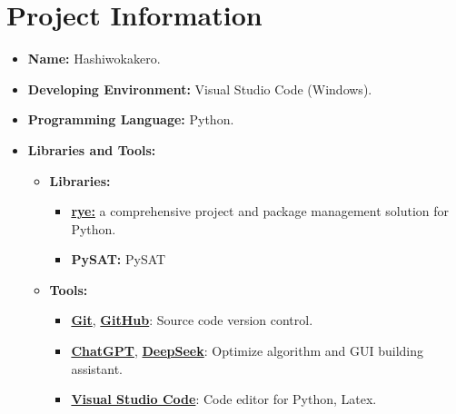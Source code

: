 \section{Project Information}
\begin{itemize}
  \item \textbf{Name:} Hashiwokakero.
  \item \textbf{Developing Environment:} Visual Studio Code (Windows).
  \item \textbf{Programming Language:} Python.
  \item \textbf{Libraries and Tools:}
        \begin{itemize}
          \item \textbf{Libraries:}
                \begin{itemize}
                  \item \href{https://rye.astral.sh/}{\textbf{rye:}} a comprehensive project and package management solution for Python.
                  \item \textbf{PySAT:} PySAT
                \end{itemize}
          \item \textbf{Tools:}
                \begin{itemize}
                  \item \href{https://git-scm.com/}{\textbf{Git}}, \href{https://github.com/}{\textbf{GitHub}}: Source code version control.
                  \item \href{https://chatgpt.com/}{\textbf{ChatGPT}}, \href{https://chat.deepseek.com/}{\textbf{DeepSeek}}: Optimize algorithm and GUI building assistant.
                  \item \href{https://code.visualstudio.com/}{\textbf{Visual Studio Code}}: Code editor for Python, Latex.
                \end{itemize}
        \end{itemize}
\end{itemize}
